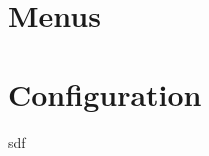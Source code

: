 \documentclass[fontsize=12pt,
               paper=a4,
               twoside=false,
               parskip=half,
               ]{scrartcl}
\begin{document}
\section{Menus}


\section{Configuration}
\label{sec:configuration}

sdf











\end{document}
